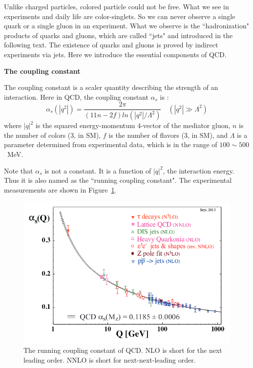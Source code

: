 Unlike charged particles, colored particle could not be free. What we see in experiments and daily life are 
color-singlets. So we can never observe a single quark or a single gluon 
in an experiment. 
What we observe is the ``hadronization" products of quarks and gluons, which are
called ``jets" and introduced in the following text. The existence of quarks and gluons is proved by indirect experiments via jets. 
Here we introduce the essential components of QCD. 

{\bf The coupling constant}

The coupling constant is a scaler quantity describing the strength of an interaction. 
Here in QCD, the coupling constant $\alpha_{s}$ is :
\begin{equation}
\alpha_{s}(|q^2|) = \frac{2\pi}{(11n-2f)ln(|q^2|/\Lambda^2)}   \quad (|q^2| \gg \Lambda^2)
\label{equation:coupling}
\end{equation}
where  $|q|^2$ is the squared energy-momentum 4-vector of the mediator gluon, $n$ is the number of colors (3, in SM), 
$f$ is the number of flavors (3, in SM), and $\Lambda$ is a parameter determined from 
experimental data, which is in the range of $100 {\sim} 500$~MeV. 

Note that $\alpha_{s}$ is not a constant. 
It is a function of $|q|^2$, the interaction energy. Thus 
it is also named as the ``running coupling constant".  
The experimental measurements are shown 
in Figure~\ref{figs:coupling}.

\begin{figure}[htb]
\centering
\includegraphics[width=.7\textwidth]{figures/alphasrunning.png}
\caption{The running coupling constant of QCD. NLO is short for the next leading order.
NNLO is short for next-next-leading order.}
\label{figs:coupling}
\end{figure}  

